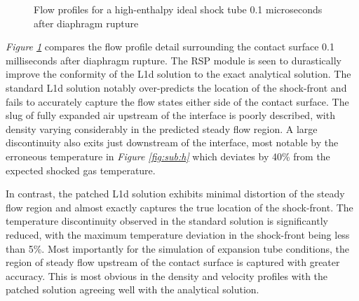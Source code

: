 \documentclass[a4paper,10pt]{article}
\begin{document}
\begin{figure}[htbp]
\begin{center}
{{      } \quad
      }
    \caption{Flow profiles for a high-enthalpy ideal shock tube 0.1 microseconds after diaphragm rupture}
    \label{fig:he_profiles}
  \end{center}
\end{figure}

\emph{Figure \ref{fig:he_profiles}} compares the flow profile detail surrounding the contact surface 0.1 milliseconds after diaphragm rupture.  The RSP module is seen to durastically improve the conformity of the L1d solution to the exact analytical solution.  The standard L1d solution notably over-predicts the location of the shock-front and fails to accurately capture the flow states either side of the contact surface.  The slug of fully expanded air upstream of the interface is poorly described, with density varying considerably in the predicted steady flow region.  A large discontinuity also exits just downstream of the interface, most notable by the erroneous temperature in \emph{Figure \ref{fig:sub:h}} which deviates by 40\% from the expected shocked gas temperature.

\par \medskip

In contrast, the patched L1d solution exhibits minimal distortion of the steady flow region and almost exactly captures the true location of the shock-front.  The temperature discontinuity observed in the standard solution is significantly reduced, with the maximum temperature deviation in the shock-front being less than 5\%.  Most importantly for the simulation of expansion tube conditions, the region of steady flow upstream of the contact surface is captured with greater accuracy.  This is most obvious in the density and velocity profiles with the patched solution agreeing well with the analytical solution.
\end{document}

